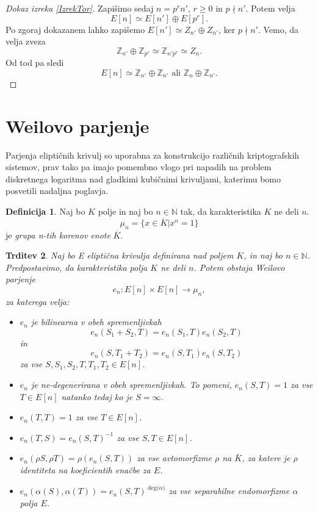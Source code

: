 \documentclass[12pt,a4paper,twoside]{article}
\theoremstyle{definition} %
\newtheorem{definicija}{Definicija}[section]
\theoremstyle{plain} %
\newtheorem{trditev}[definicija]{Trditev}
\numberwithin{equation}{section}  %
\newcommand{\N}{\mathbb N}
\newcommand{\Z}{\mathbb Z}
\newcommand{\DEG}[1]{\ \text{deg(}{#1}\text{)}}
\begin{document}
\begin{proof}[Dokaz izreka \ref{IzrekTor}]
Zapišimo sedaj $n=p^rn'$, $r\geq0$ in $p\nmid n'$. Potem velja
$$E[n] \simeq E[n'] \oplus E[p^r].$$
Po zgoraj dokazanem lahko zapišemo $E[n'] \simeq Z_{n'} \oplus Z_{n'}$, ker $p \nmid n'$. Vemo, da velja zveza
$$\Z_{n'} \oplus \Z_{p^r} \simeq \Z_{n'p^r} \simeq Z_n.$$
Od tod pa sledi
$$E[n] \simeq \Z_{n'} \oplus \Z_{n'} \text{ ali } \Z_n \oplus \Z_{n'}.$$
\end{proof}
\newpage
\section{Weilovo parjenje}
Parjenja eliptičnih krivulj \cite{Washington2008} so uporabna za konstrukcijo različnih kriptografskih sistemov, prav tako pa imajo pomembno vlogo pri napadih na problem diskretnega logaritma nad
gladkimi kubičnimi krivuljami, katerimu bomo posvetili nadaljna poglavja.

\begin{definicija}
Naj bo $K$ polje in naj bo $n \in \N$ tak, da karakteristika $K$ ne deli $n$.
$$\mu_n = \{ x \in \overline{K} | x^n = 1 \}$$
je \emph{grupa n-tih korenov enote} $\overline{K}$.
\end{definicija}

\begin{trditev}
\label{trd-WeilPar}
Naj bo E eliptična krivulja definirana nad poljem $K$, in naj bo $n \in \N$. Predpostavimo, da karakteristika polja $K$ ne deli $n$. Potem obstaja Weilovo parjenje
$$e_n:E[n] \times E[n] \rightarrow \mu_n,$$
za katerega velja:
\begin{itemize}
\item $e_n$ je bilinearna v obeh spremenljivkah
$$e_n(S_1+S_2,T) = e_n(S_1,T)e_n(S_2,T)$$
in
$$e_n(S,T_1+T_2) = e_n(S,T_1)e_n(S,T_2)$$
za vse $S,S_1,S_2,T,T_1,T_2 \in E[n]$.
\item $e_n$ je ne-degenerirana v obeh spremenljivkah. To pomeni, $e_n(S,T) = 1$ za vse $T \in E[n]$ natanko tedaj ko je $S = \infty$.

\item $e_n(T,T) = 1$ za vse $T \in E[n]$.

\item $e_n(T,S) = e_n(S,T)^{-1}$ za vse $S,T \in E[n]$.

\item $e_n(\rho S,\rho T) = \rho(e_n(S,T))$ za vse avtomorfizme $\rho$ na $\bar{K}$, za katere je $\rho$ identiteta na koeficientih enačbe za $E$.

\item $e_n(\alpha(S),\alpha(T)) = e_n(S,T)^{\DEG{\alpha}}$ za vse separabilne endomorfizme $\alpha$ polja $E$.
\end{itemize}

\end{trditev}
\end{document}
